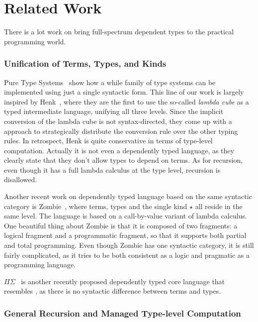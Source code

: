 \section{Related Work}
\label{sec:related}

There is a lot work on bring full-spectrum dependent types to the practical programming world.

\subsubsection{Unification of Terms, Types, and Kinds}
 

Pure Type Systems~\cite{pts} show how a while family of type systems
can be implemented using just a single syntactic form. This line of
our work is largely inspired by Henk~\cite{pts:henk}, where they are
the first to use the so-called \emph{lambda cube} as a typed
intermediate language, unifying all three levels. Since the implicit
conversion of the lambda cube is not syntax-directed, they come up
with a approach to strategically distribute the conversion rule over
the other typing rules. In retrospect, Henk is quite conservative in
terms of type-level computation. Actually it is not even a dependently
typed language, as they clearly state that they don't allow types to
depend on terms. As for recursion, even though it has a full lambda
calculus at the type level, recursion is disallowed.

Another recent work on dependently typed language based on the same syntactic category is \textsf{Zombie}~\cite{zombie:popl14, zombie:thesis}, where terms, types and the single kind $\star$ all reside in the same level. The language is based on a call-by-value variant of lambda calculus. One beautiful thing about Zombie is that it is composed of two fragments: a logical fragment and a programmatic fragment, so that it supports both partial and total programming. Even though Zombie has one syntactic category, it is still fairly complicated, as it tries to be both consistent as a logic and pragmatic as a programming language.

$\Pi\Sigma$~\cite{dep:pisigma} is another recently proposed dependently typed core language that resembles \name, as there is no syntactic difference between terms and types.\bruno{}


\subsubsection{General Recursion and Managed Type-level Computation}

